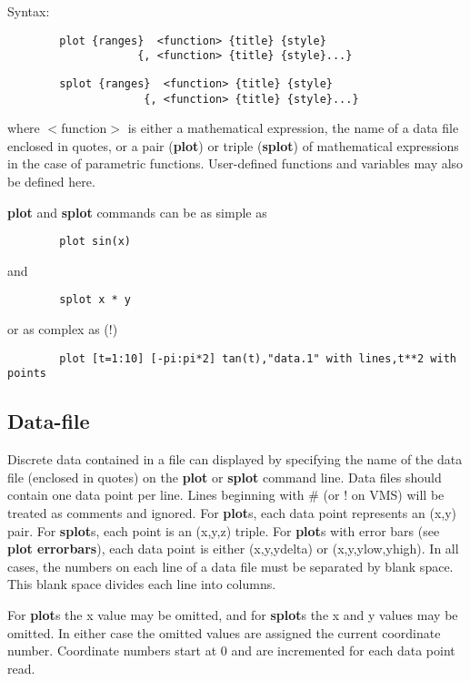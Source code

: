 Syntax:

\begin{verbatim}
        plot {ranges}  <function> {title} {style}
                    {, <function> {title} {style}...}
\end{verbatim}

\begin{verbatim}
        splot {ranges}  <function> {title} {style}
                     {, <function> {title} {style}...}
\end{verbatim}

where $<$function$>$ is either a mathematical expression, the name of a
data file enclosed in quotes, or a pair ({\bf plot}) or triple ({\bf splot})
of mathematical expressions in the case of parametric functions.
User-defined functions and variables may also be defined here.

{\bf plot} and {\bf splot} commands can be as simple as

\begin{verbatim}
        plot sin(x)
\end{verbatim}

and

\begin{verbatim}
        splot x * y
\end{verbatim}

or as complex as (!)

\begin{verbatim}
        plot [t=1:10] [-pi:pi*2] tan(t),"data.1" with lines,t**2 with points
\end{verbatim}
\subsection{Data-file}
Discrete data contained in a file can displayed by specifying the
name of the data file (enclosed in quotes) on the {\bf plot} or {\bf splot}
command line. Data files should contain one data point per line.
Lines beginning with \# (or ! on VMS) will be treated as comments
and ignored. For {\bf plot}s, each data point represents an (x,y)
pair. For {\bf splot}s, each point is an (x,y,z) triple. For {\bf plot}s with
error bars (see {\bf plot errorbars}), each data point is either
(x,y,ydelta) or (x,y,ylow,yhigh). In all cases, the numbers on each
line of a data file must be separated by blank space. This blank
space divides each line into columns.

For {\bf plot}s the x value may be omitted, and for {\bf splot}s the x
and y values may be omitted. In either case the omitted values are
assigned the current coordinate number. Coordinate numbers start at 0
and are incremented for each data point read.

